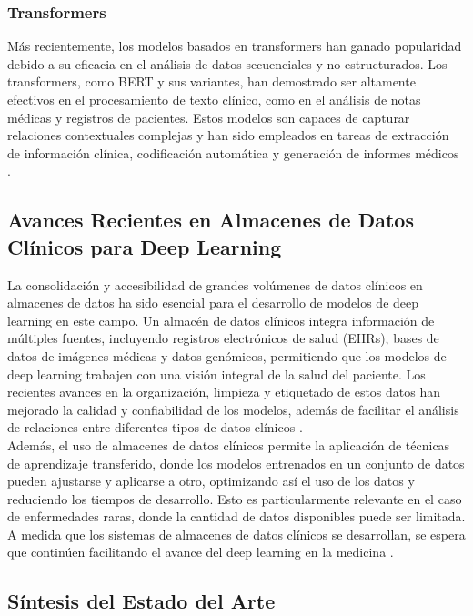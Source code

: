 \documentclass{article}
\begin{document}
\subsubsection{Transformers}

Más recientemente, los modelos basados en transformers han ganado popularidad debido a su eficacia en el análisis de datos secuenciales y no estructurados. Los transformers, como BERT y sus variantes, han demostrado ser altamente efectivos en el procesamiento de texto clínico, como en el análisis de notas médicas y registros de pacientes. Estos modelos son capaces de capturar relaciones contextuales complejas y han sido empleados en tareas de extracción de información clínica, codificación automática y generación de informes médicos \cite{devlin2018bert, li2020behrt}.

\subsection{Avances Recientes en Almacenes de Datos Clínicos para Deep Learning}

La consolidación y accesibilidad de grandes volúmenes de datos clínicos en almacenes de datos ha sido esencial para el desarrollo de modelos de deep learning en este campo. Un almacén de datos clínicos integra información de múltiples fuentes, incluyendo registros electrónicos de salud (EHRs), bases de datos de imágenes médicas y datos genómicos, permitiendo que los modelos de deep learning trabajen con una visión integral de la salud del paciente. Los recientes avances en la organización, limpieza y etiquetado de estos datos han mejorado la calidad y confiabilidad de los modelos, además de facilitar el análisis de relaciones entre diferentes tipos de datos clínicos \cite{miotto2018deep}.
\\

Además, el uso de almacenes de datos clínicos permite la aplicación de técnicas de aprendizaje transferido, donde los modelos entrenados en un conjunto de datos pueden ajustarse y aplicarse a otro, optimizando así el uso de los datos y reduciendo los tiempos de desarrollo. Esto es particularmente relevante en el caso de enfermedades raras, donde la cantidad de datos disponibles puede ser limitada. A medida que los sistemas de almacenes de datos clínicos se desarrollan, se espera que continúen facilitando el avance del deep learning en la medicina \cite{shickel2017deep}.

\subsection{Síntesis del Estado del Arte}
\end{document}
